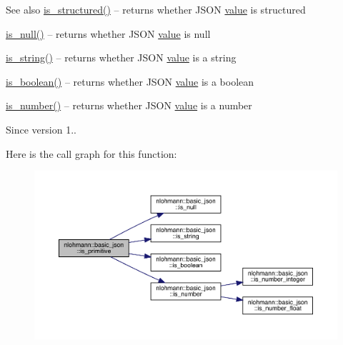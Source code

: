\begin{DoxySeeAlso}{See also}
\mbox{\hyperlink{classnlohmann_1_1basic__json_a9f68a0af820c3ced7f9d17851ce4c22d}{is\+\_\+structured()}} -- returns whether J\+S\+ON \mbox{\hyperlink{classnlohmann_1_1basic__json_af9c51328fbe1da75eca750be3009917a}{value}} is structured 

\mbox{\hyperlink{classnlohmann_1_1basic__json_a8faa039ca82427ed29c486ffd00600c3}{is\+\_\+null()}} -- returns whether J\+S\+ON \mbox{\hyperlink{classnlohmann_1_1basic__json_af9c51328fbe1da75eca750be3009917a}{value}} is {\ttfamily null} 

\mbox{\hyperlink{classnlohmann_1_1basic__json_a69b596a4a6683b362095c9a139637396}{is\+\_\+string()}} -- returns whether J\+S\+ON \mbox{\hyperlink{classnlohmann_1_1basic__json_af9c51328fbe1da75eca750be3009917a}{value}} is a string 

\mbox{\hyperlink{classnlohmann_1_1basic__json_a943e8cb182d0f2365c76d64b42eaa6fd}{is\+\_\+boolean()}} -- returns whether J\+S\+ON \mbox{\hyperlink{classnlohmann_1_1basic__json_af9c51328fbe1da75eca750be3009917a}{value}} is a boolean 

\mbox{\hyperlink{classnlohmann_1_1basic__json_a2b9852390abb4b1ef5fac6984e2fc0f3}{is\+\_\+number()}} -- returns whether J\+S\+ON \mbox{\hyperlink{classnlohmann_1_1basic__json_af9c51328fbe1da75eca750be3009917a}{value}} is a number
\end{DoxySeeAlso}
\begin{DoxySince}{Since}
version 1.. 
\end{DoxySince}
Here is the call graph for this function\+:\nopagebreak
\begin{figure}[H]
\begin{center}
\leavevmode
\includegraphics[width=350pt]{classnlohmann_1_1basic__json_a6362b88718eb5c6d4fed6a61eed44b95_cgraph}
\end{center}
\end{figure}

